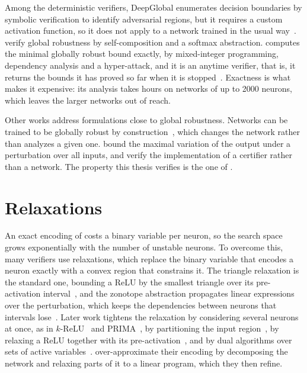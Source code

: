 Among the deterministic verifiers, DeepGlobal enumerates decision
boundaries by symbolic verification to identify adversarial regions,
but it requires a custom activation function, so it does not apply to
a network trained in the usual way~\citep{sun2022deepglobal}.
\citet{athavale2024} verify global robustness by self-composition and
a softmax abstraction. 
\baseline{} computes the minimal globally robust
bound exactly, by mixed-integer programming, dependency analysis and a
hyper-attack, and it is an anytime verifier, that is, it returns the
bounds it has proved so far when it is stopped~\citep{kabaha2024vhagar}.
Exactness is what makes it expensive: its analysis takes hours on
networks of up to 2000 neurons, which leaves the larger networks out
of reach.

Other works address formulations close to global robustness.
Networks can be trained to be globally robust by
construction~\citep{leino2021gloro}, which changes the network rather
than analyzes a given one. \citet{wang2022} bound the maximal variation of the output under a perturbation over all inputs,
and \citet{tobler2025} verify the implementation of a
certifier rather than a network. The property this thesis verifies is
the one of \baseline.

\section{Relaxations}
\label{sec:related-relaxations}

An exact encoding of  costs a binary variable per
 neuron, so the search space grows exponentially with the number of unstable neurons. To
overcome this, many verifiers use relaxations, which replace the
binary variable that encodes a neuron exactly with a convex region
that constrains it. The triangle relaxation
is the standard one, bounding a ReLU by the smallest triangle over its
pre-activation interval~\citep{ehlers2017,singh2019}, and the zonotope
abstraction propagates linear expressions over the perturbation, which
keeps the dependencies between neurons that intervals
lose~\citep{singh2018fast,gehr2018,mirman2018differentiable}. Later
work tightens the relaxation by considering several neurons at once,
as in $k$-ReLU~\citep{singh2019krelu} and
PRIMA~\citep{muller2022prima}, by partitioning the input
region~\citep{anderson2020tightened}, by relaxing a ReLU together with
its pre-activation~\citep{tjandraatmadja2020convex}, and by dual
algorithms over sets of active
variables~\citep{depalma2021}. \citet{wang2022} over-approximate their encoding by decomposing the network and relaxing parts of it to a linear program, which they then refine.

